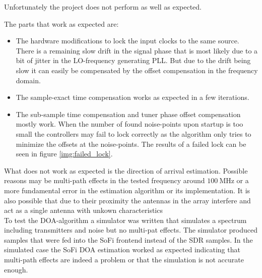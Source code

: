Unfortunately the project does not perform as
well as expected.

The parts that work as expected are:

\begin{itemize}
\item
  The hardware modifications to lock the input clocks
  to the same source. \\
  There is a remaining slow drift in
  the signal phase that is most likely due to a bit of jitter
  in the LO-frequency generating PLL.
  But due to the drift being slow it can easily be compensated by
  the offset compensation in the frequency domain.

\item
  The sample-exact time compensation works as expected in
  a few iterations.

\item
  The sub-sample time compensation and tuner phase
  offset compensation mostly work.
  When the number of found noise-points upon startup
  is too small the controllers may fail to lock
  correctly as the algorithm only tries to minimize the
  offsets at the noise-points.
  The results of a failed lock can be seen in figure
  \ref{img:failed_lock}.
\end{itemize}

What does not work as expected is the direction
of arrival estimation. Possible reasons may be
multi-path effects in the tested frequency
around $\SI{100}{\mega\hertz}$ or a more
fundamental error in the estimation algorithm
or its implementation.
It is also possible that due to their proximity
the antennas in the array interfere and act
as a single antenna with unkown characteristics\\

To test the DOA-algorithm a simulator
was written that simulates a spectrum
including transmitters and noise but no
multi-pat effects.
The simulator produced samples that were
fed into the SoFi frontend instead of the
SDR samples.
In the simulated case the SoFi DOA estimation
worked as expected indicating that multi-path
effects are indeed a problem or that the simulation
is not accurate enough.
